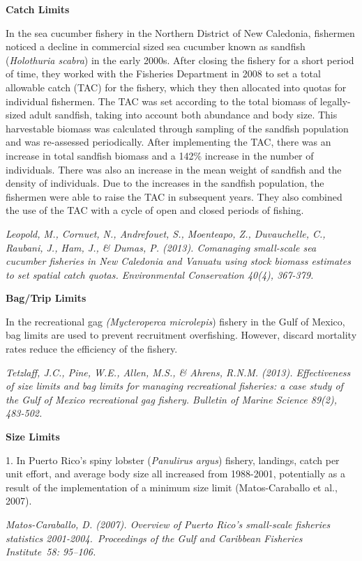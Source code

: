 \documentclass[]{book}
\begin{document}
\textbf{Catch Limits}

In the sea cucumber fishery in the Northern District of New Caledonia,
fishermen noticed a decline in commercial sized sea cucumber known as
sandfish (\emph{Holothuria scabra}) in the early 2000s. After closing
the fishery for a short period of time, they worked with the Fisheries
Department in 2008 to set a total allowable catch (TAC) for the fishery,
which they then allocated into quotas for individual fishermen. The TAC
was set according to the total biomass of legally-sized adult sandfish,
taking into account both abundance and body size. This harvestable
biomass was calculated through sampling of the sandfish population and
was re-assessed periodically. After implementing the TAC, there was an
increase in total sandfish biomass and a 142\% increase in the number of
individuals. There was also an increase in the mean weight of sandfish
and the density of individuals. Due to the increases in the sandfish
population, the fishermen were able to raise the TAC in subsequent
years. They also combined the use of the TAC with a cycle of open and
closed periods of fishing.

\emph{Leopold, M., Cornuet, N., Andrefouet, S., Moenteapo, Z.,
Duvauchelle, C., Raubani, J., Ham, J., \& Dumas, P. (2013). Comanaging
small-scale sea cucumber fisheries in New Caledonia and Vanuatu using
stock biomass estimates to set spatial catch quotas. Environmental
Conservation 40(4), 367-379.}

\textbf{Bag/Trip Limits}

In the recreational gag \emph{(Mycteroperca microlepis}) fishery in the
Gulf of Mexico, bag limits are used to prevent recruitment overfishing.
However, discard mortality rates reduce the efficiency of the fishery.

\emph{Tetzlaff, J.C., Pine, W.E., Allen, M.S., \& Ahrens, R.N.M. (2013).
Effectiveness of size limits and bag limits for managing recreational
fisheries: a case study of the Gulf of Mexico recreational gag fishery.
Bulletin of Marine Science 89(2), 483-502.}

\textbf{Size Limits}

1. In Puerto Rico's spiny lobster (\emph{Panulirus argus}) fishery,
landings, catch per unit effort, and average body size all increased
from 1988-2001, potentially as a result of the implementation of a
minimum size limit (Matos-Caraballo et al., 2007).

\emph{Matos-Caraballo, D. (2007). Overview of Puerto Rico's small-scale
fisheries statistics 2001-2004.~Proceedings of the Gulf and Caribbean
Fisheries Institute~58: 95--106.}
\end{document}
